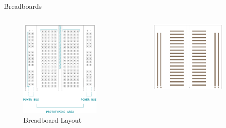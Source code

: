 \begin{frame}{Breadboards}
    \begin{columns}[t]
        \begin{column}{0.5\textwidth}
            \begin{figure}
                \includegraphics[width=0.9\textwidth]{images/microcontroller/breadboard-expl-1.pdf}
                \caption{Breadboard Layout}
            \end{figure}
        \end{column}
        \begin{column}{0.5\textwidth}
            \begin{figure}
                \includegraphics[width=0.9\textwidth]{images/microcontroller/breadboard-expl-2.pdf}

\end{figure}
\end{column}
\end{columns}
\end{frame}
